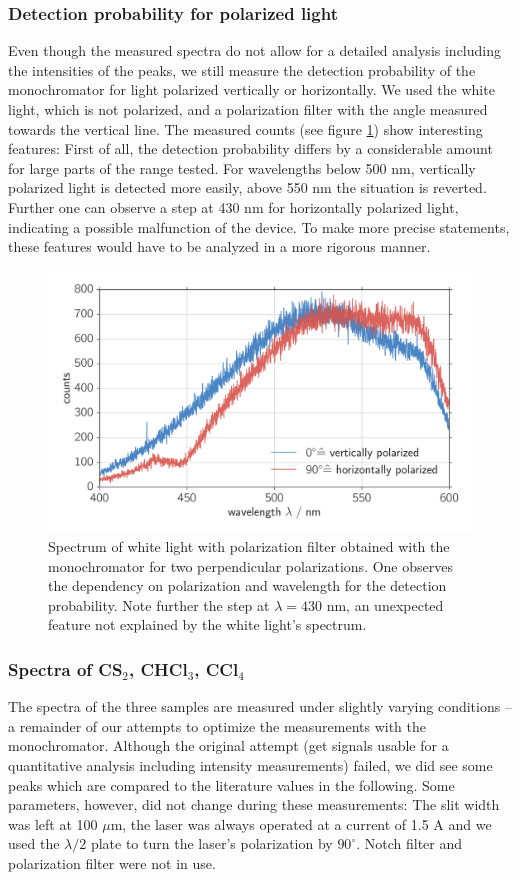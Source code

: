 \subsubsection{Detection probability for polarized light}  
Even though the measured spectra do not allow for a detailed analysis including the intensities of the peaks, we still 
measure the detection probability of the monochromator for light polarized vertically or horizontally. We used the white 
light, which is not polarized, and a polarization filter with the angle measured towards the vertical line. The measured
counts (see figure \ref{fig:mono_polarized}) show interesting features: First of all, the detection probability differs by 
a considerable amount for large parts of the range tested. For wavelengths below 500 nm, vertically polarized light is 
detected more easily, above 550 nm the situation is reverted. Further one can observe a step at 430 nm for horizontally 
polarized light, indicating a possible malfunction of the device. To make more precise statements, these features would 
have to be analyzed in a more rigorous manner. 

\begin{figure}[htpb]
    \centering
    \includegraphics[width=0.8\linewidth]{analysis/figures/mono_polarized}
    \caption{Spectrum of white light with polarization filter obtained with the monochromator for two perpendicular 
    polarizations. One observes the dependency on polarization and wavelength for the detection probability. Note further 
    the step at $\lambda = 430$ nm, an unexpected feature not explained by the white light's spectrum. }
    \label{fig:mono_polarized}
\end{figure}

\subsubsection{Spectra of CS$_2$, CHCl$_3$, CCl$_4$}
The spectra of the three samples are measured under slightly varying conditions -- a remainder of our attempts to 
optimize the measurements with the monochromator. Although the original attempt (get signals usable for a quantitative 
analysis including intensity measurements) failed, we did see some peaks which are compared to the literature values in 
the following. Some parameters, however, did not change during these measurements: The slit width was left at 100 $\mu$m, 
the laser was always operated at a current of 1.5 A and we used the $\lambda / 2$ plate to turn the laser's polarization 
by $90^\circ$. Notch filter and polarization filter were not in use. 


